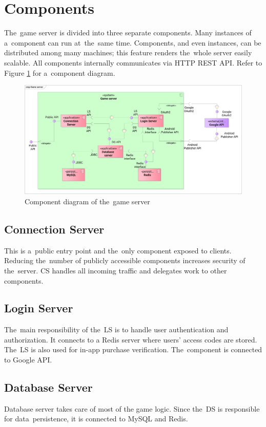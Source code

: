 \section{Components}
The~game server is divided into three separate components. Many instances of a~component can run at~the~same time. Components, and even instances, can be distributed among many machines; this feature renders the~whole server easily scalable. All components internally communicates via HTTP REST API. Refer to Figure \ref{fig:components} for a~component diagram.

\begin{figure}[h]	
	\includegraphics[width=\textwidth]{figures/Components}
	\centering			
	\caption{Component diagram of the~game server}
	\label{fig:components}
\end{figure}

	\subsection{Connection Server}
	This is a~public entry point and the~only component exposed to clients. Reducing the~number of publicly accessible components increases security of the~server. CS handles all incoming traffic and delegates work to other components. 
	
	\subsection{Login Server}
	The~main responsibility of the~LS is to handle user authentication and authorization. It connects to a Redis server where users' access codes are stored. The~LS is also used for in-app purchase verification. The~component is connected to Google API.
	
	\subsection{Database Server}
	Database server takes care of most of the game logic. Since the~DS is responsible for data~persistence, it is connected to MySQL and Redis.

